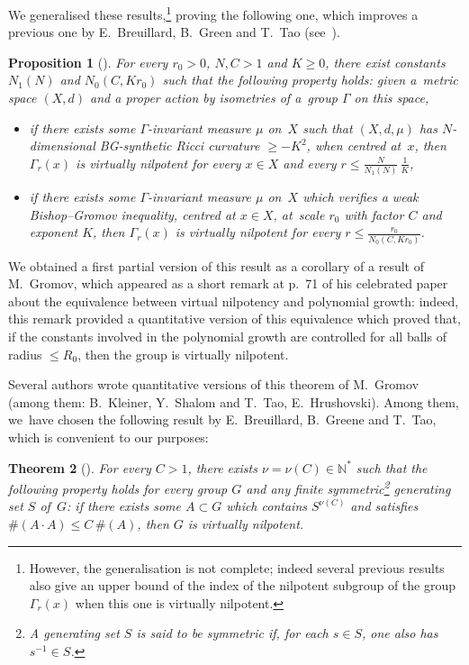 \documentclass[pdftex]{sigma}
\numberwithin{equation}{section}
\newtheorem{theor}{Theorem}[section]
\newtheorem{prop}[theor]{Proposition}
\newcommand{\N}{\mathbb{N}}
\begin{document}
We generalised these results,\footnote{However, the generalisation is not complete; indeed several previous results also give an upper bound of the
index of the nilpotent subgroup of the group $\Gamma_r (x)$ when this one
is virtually nilpotent.} proving the following one, which improves a previous one by E.~Breuillard, B.~Green and T.~Tao (see~\cite{BGT}).

\begin{prop}[{\cite[Corollary~5.20]{BCGS}}]\label{Marg1}
For every $r_0 >0$, $N, C > 1 $ and $K\ge 0$, there exist constants
$N_1 (N)$ and $N_0 (C, Kr_0)$ such that the following property holds: given
a~metric space $(X,d)$ and a proper action by isometries of a~group $\Gamma$ on this space,
\begin{itemize}\itemsep=0pt
\item[$(i)$] if there exists some $\Gamma$-invariant measure $\mu$ on~$X$ such that $(X,d,\mu)$ has $N$-dimensional BG-synthetic Ricci curvature $\ge -K^2$, when centred at~$x$, then $\Gamma_r (x)$ is virtually nilpotent for every $x \in X$ and every $r \le \frac{N}{N_1 (N)}\, \frac{1}{K}$,
\item[$(ii)$] if there exists some $\Gamma$-invariant measure $\mu$ on~$X$ which verifies a weak Bishop--Gromov inequality, centred at $x\in X$, at~scale
$r_0$ with factor $C$ and exponent $K$, then $\Gamma_{r} (x)$ is virtually nilpotent for every $r \le \frac{r_0}{ N_0 (C, Kr_0)}$.
\end{itemize}
\end{prop}

We obtained a first partial version of this result as a corollary of a result of M.~Gromov, which appeared as a short remark at p.~71 of his celebrated paper~\cite{Gr3}
about the equivalence between virtual nilpotency and polynomial growth: indeed, this remark provided a quantitative version of this equivalence which
proved that, if the constants involved in the polynomial growth are controlled for all balls of radius $\le R_0$, then the group is virtually nilpotent.

Several authors wrote quantitative versions of this theorem of M.~Gromov (among them: B.~Kleiner, Y.~Shalom and T.~Tao, E.~Hrushovski). Among them, we~have chosen the following result by E.~Breuillard, B.~Greene and T.~Tao, which is convenient to our purposes:

\begin{theor}[{\cite[Corollary~11.2]{BGT}}]\label{BGT}
For every $ C > 1$, there exists $ \nu = \nu (C) \in \N^*$ such that the following
property holds for every group $ G$ and any finite symmetric\footnote{A generating set $S$ is said to be symmetric if, for each $s \in S$,
one also has $s^{-1} \in S$.} generating set $S$ of~$G$: if there exists
some $A \subset G$ which contains $S^{\nu (C)}$ and satisfies $\# (A\cdot
A) \le C \,\# (A)$, then
$G$ is virtually nilpotent.
\end{theor}
\end{document}
